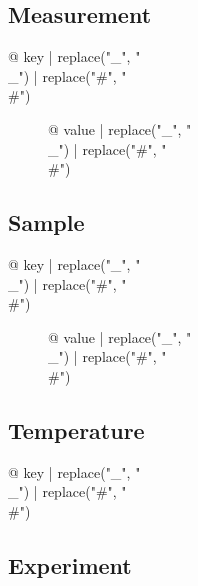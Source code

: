 \begin{multicols}{2}

\subsection{Measurement}

\begin{description}
\item[{@ key | replace("_", "\\_") | replace("#", "\\#") }] {@ value | replace("_", "\\_") | replace("#", "\\#") }
\end{description}

\subsection{Sample}

\begin{description}
\item[{@ key | replace("_", "\\_") | replace("#", "\\#") }] {@ value | replace("_", "\\_") | replace("#", "\\#") }
\end{description}

\subsection{Temperature}

\begin{description}
\item[{@ key | replace("_", "\\_") | replace("#", "\\#") }] %
\end{description}

\subsection{Experiment}


\end{multicols}
